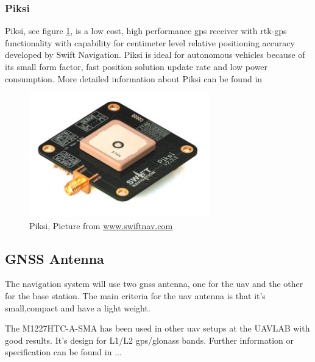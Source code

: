 \subsubsection{Piksi}\label{ss:Piksi}
Piksi, see figure \ref{figure:Piksi}, is a low cost, high performance \gls{gps} receiver with \gls{rtk-gps} functionality with capability for centimeter level relative positioning accuracy developed by Swift Navigation. Piksi is ideal for autonomous vehicles because of its small form factor, fast position solution update rate and low power consumption. 
More detailed information about Piksi can be found in \citep{Piksiv231}
\begin{figure}[H]
	\centering
		\includegraphics[width=0.7\textwidth]{figs/piksi_top.jpg}
		\caption{Piksi, Picture from \url{www.swiftnav.com}}
		\label{figure:Piksi}
\end{figure}
\subsection{GNSS Antenna}
The navigation system will use two \gls{gnss} antenna, one for the \gls{uav} and the other for the base station. The main criteria for the \gls{uav} antenna is that it's small,compact and have a light weight.

The M1227HTC-A-SMA has been used in other \gls{uav} setups at the UAVLAB with good results. It's design for L1/L2 gps/glonass bands. Further information or specification can be found in ...

